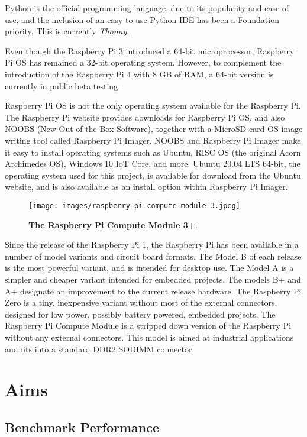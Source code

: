 Python is the official programming language, due to its popularity and ease of use, and the inclusion of an easy to use Python IDE has been a Foundation priority. This is currently \emph{Thonny}. 

Even though the Raspberry Pi 3 introduced a 64-bit microprocessor, Raspberry Pi OS has remained a 32-bit operating system. However, to complement the introduction of the Raspberry Pi 4 with 8 GB of RAM, a 64-bit version is currently in public beta testing.

Raspberry Pi OS is not the only operating system available for the Raspberry Pi. The Raspberry Pi website provides downloads for Raspberry Pi OS, and also NOOBS (New Out of the Box Software), together with a MicroSD card OS image writing tool called Raspberry Pi Imager. NOOBS and Raspberry Pi Imager make it easy to install operating systems such as Ubuntu, RISC OS (the original Acorn Archimedes OS), Windows 10 IoT Core, and more. Ubuntu 20.04 LTS 64-bit, the operating system used for this project, is available for download from the Ubuntu website, and is also available as an install option within Raspberry Pi Imager.

\begin{figure}
	\centering	
	\texttt{[image: images/raspberry-pi-compute-module-3.jpeg]}
	\caption{\textbf{The Raspberry Pi Compute Module 3+}.}
\end{figure}

Since the release of the Raspberry Pi 1, the Raspberry Pi has been available in a number of model variants and circuit board formats. The Model B of each release is the most powerful variant, and is intended for desktop use. The Model A is a simpler and cheaper variant intended for embedded projects. The models B+ and A+ designate an improvement to the current release hardware. The Raspberry Pi Zero is a tiny, inexpensive variant without most of the external connectors, designed for low power, possibly battery powered, embedded projects. The Raspberry Pi Compute Module is a stripped down version of the Raspberry Pi without any external connectors. This model is aimed at industrial applications and fits into a standard DDR2 SODIMM connector.


%
%
\section{Aims}


%
%
\subsection{Benchmark Performance}

